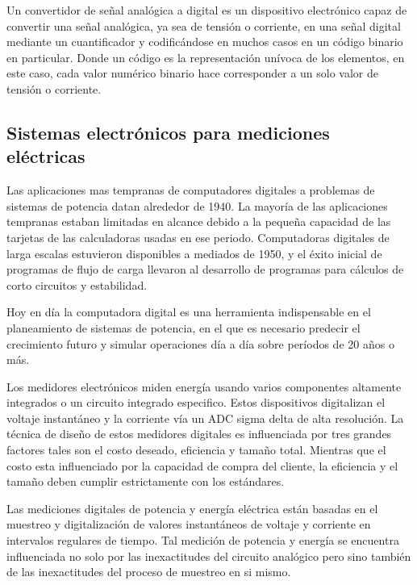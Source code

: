 Un convertidor de señal analógica a digital es un dispositivo electrónico capaz de convertir una señal analógica, ya sea de tensión o corriente, en una señal digital mediante un cuantificador y codificándose en muchos casos en un código binario en particular. Donde un código es la representación unívoca de los elementos, en este caso, cada valor numérico binario hace corresponder a un solo valor de tensión o corriente.



\subsection{Sistemas electrónicos para mediciones eléctricas}

Las aplicaciones mas tempranas de computadores digitales a problemas de sistemas de potencia datan alrededor de 1940. La mayoría de las aplicaciones tempranas estaban limitadas en alcance debido a la pequeña capacidad de las tarjetas de las calculadoras usadas en ese periodo. Computadoras digitales de larga escalas estuvieron disponibles a mediados de 1950, y el éxito inicial de programas de flujo de carga llevaron al desarrollo de programas para cálculos de corto circuitos y estabilidad.\citep{761852}

Hoy en día la computadora digital es una herramienta indispensable en el planeamiento de sistemas de potencia, en el que es necesario predecir el crecimiento futuro y simular operaciones día  a día sobre períodos de 20 años o más.\cite{761852}

Los medidores electrónicos miden energía usando varios componentes altamente integrados o un circuito integrado especifico. Estos dispositivos digitalizan el voltaje instantáneo y la corriente vía un ADC sigma delta  de alta resolución. La técnica de diseño de estos medidores digitales es influenciada por tres grandes factores tales son el costo deseado, eficiencia y tamaño total. Mientras que el costo esta influenciado por la capacidad de compra del cliente, la eficiencia y el tamaño deben cumplir estrictamente con los estándares.\cite{articleDM}

Las mediciones digitales de potencia y energía eléctrica están basadas en el muestreo y digitalización de valores instantáneos de voltaje y corriente en intervalos regulares de tiempo. Tal medición de potencia y energía se encuentra influenciada no solo por las inexactitudes del circuito analógico pero sino también de las inexactitudes del proceso de muestreo en si mismo.

